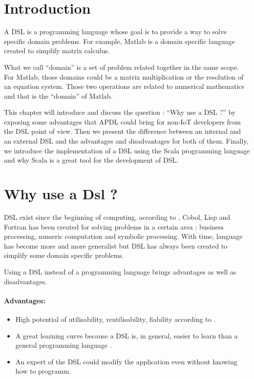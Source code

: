\label{cha:a-dsl}

\section{Introduction}
\label{sec:dsl_intro}

A \gls{DSL} is a programming language whose goal is
to provide a way to solve specific domain problems. For example, Matlab is a
domain specific language created to simplify matrix calculus.

What we call ``domain'' is a set of problem related together in the same scope.
For Matlab, those domains could be a matrix multiplication or the resolution of an
equation system. Those two operations are related to numerical mathematics and
that is the ``domain'' of Matlab.

This chapter will introduce and discuss the question : ``Why use a DSL ?'' by
exposing some advantages that \gls{APDL} could bring for non-IoT developers from
the \gls{DSL} point of view.
Then we present the difference between an internal and an external DSL and the
advantages and disadvantages for both of them. Finally, we introduce the
implementation of a \gls{DSL} using the Scala programming language and why Scala
is a great tool for the development of \gls{DSL}.

\section{Why use a Dsl ?}
\label{sec:why-use-dsl}

\gls{DSL} exist since the beginning of computing, according to
\cite{vandeursenarieklintpaulvisserjoost2000}, Cobol, Lisp and Fortran has been
created for solving problems in a certain area : business processing, numeric
computation and symbolic processing. With time, language has become more and
more generalist but \gls{DSL} has always been created to simplify some domain
specific problems.

Using a DSL instead of a programming language brings advantages as well as
disadvantages.

\paragraph{Advantages:}
\begin{itemize}
\item High potential of utilisability, reutilisability, fiability according to
  \cite{Tolvanen:2010:IMD:2060329.2060354}.
\item A great learning curve because a DSL is, in general, easier to learn than a
  general programming language \cite{mernikmarjanheeringjansloaneanthonym.2005}.
\item An expert of the DSL could modify the application even without knowing how
  to programm.
\end{itemize}

